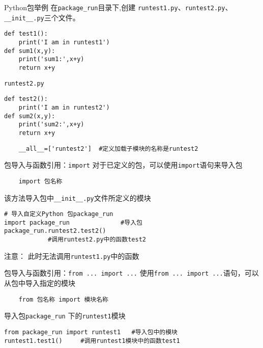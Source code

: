 \documentclass[t]{beamer}
\begin{document}
\begin{frame}[fragile]{Python包举例}
    在\verb|package_run|目录下,创建
    \verb|runtest1.py|、\verb|runtest2.py|、\verb|__init__.py|三个文件。

    \small
\begin{multicols}{2}
\begin{lstlisting}
def test1():
    print('I am in runtest1')
def sum1(x,y):
    print('sum1:',x+y)
    return x+y
\end{lstlisting}

{\color{blue}
\verb|runtest2.py|}
\begin{lstlisting}
def test2():
    print('I am in runtest2')
def sum2(x,y):
    print('sum2:',x+y)
    return x+y
\end{lstlisting}
\end{multicols}

\begin{lstlisting}
    __all__=['runtest2']  #定义加载子模块的名称是runtest2
\end{lstlisting}

\end{frame}



\begin{frame}[fragile]{包导入与函数引用：\texttt{import}}
    对于已定义的包，可以使用\texttt{import}语句来导入包
\begin{lstlisting}
    import 包名称
\end{lstlisting}
该方法导入包中\verb|__init__.py|文件所定义的模块

\begin{lstlisting}
# 导入自定义Python 包package_run
import package_run              #导入包
package_run.runtest2.test2()   
            #调用runtest2.py中的函数test2
\end{lstlisting}

\begin{block}{注意：}
此时无法调用\verb|runtest1.py|中的函数
\end{block}
\end{frame}


\begin{frame}[fragile]{包导入与函数引用：\texttt{from ... import ...}}
    使用\texttt{from ... import ...}语句，可以从包中导入指定的模块
\begin{lstlisting}
    from 包名称 import 模块名称
\end{lstlisting}

导入包\verb|package_run| 下的\verb|runtest1|模块
\begin{lstlisting}  
from package_run import runtest1   #导入包中的模块
runtest1.test1()     #调用runtest1模块中的函数test1
\end{lstlisting}

\end{frame}
\end{document}
